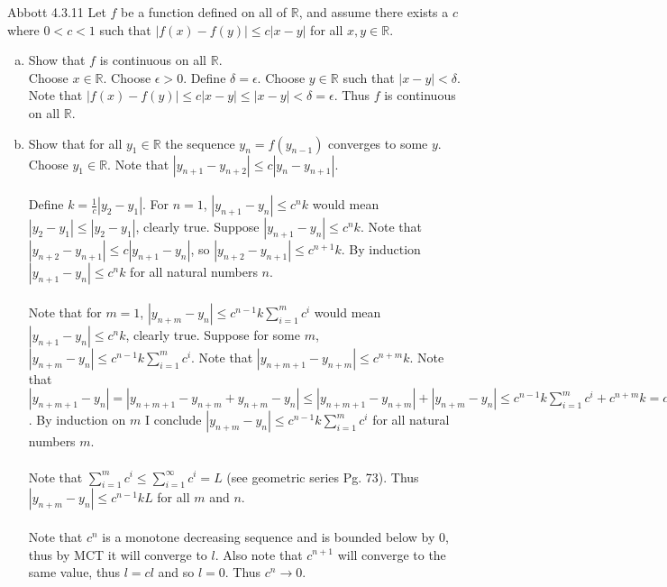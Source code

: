 \documentclass[12pt]{article}
\makeatletter
\theoremstyle{homework}
\newenvironment{exercise}[1]
{\def\@currentlabel{#1}\exercisecore}
{\endexercisecore}
\makeatother
\begin{document}
\begin{exercise} 4
Abbott 4.3.11
\end{exercise}
Let $f$ be a function defined on all of $\mathbb{R}$, and assume there exists a $c$ where $0<c<1$ such that $|f(x)-f(y)|\leq c|x-y|$ for all $x,y\in\mathbb{R}$.
\begin{enumerate}[(a)]
\item
Show that $f$ is continuous on all $\mathbb{R}$.\\
Choose $x\in\mathbb{R}$.  Choose $\epsilon>0$.  Define $\delta=\epsilon$.  Choose $y\in\mathbb{R}$ such that $|x-y|<\delta$.  Note that $|f(x)-f(y)|\leq c|x-y|\leq |x-y|<\delta=\epsilon$.  Thus $f$ is continuous on all $\mathbb{R}$.
\item
Show that for all $y_1\in\mathbb{R}$ the sequence $y_n=f(y_{n-1})$ converges to some $y$.\\
Choose $y_1\in\mathbb{R}$.  Note that $|y_{n+1}-y_{n+2}|\leq c|y_n-y_{n+1}|$.\\\\
Define $k=\frac{1}{c}|y_2-y_1|$.  For $n=1$, $|y_{n+1} - y_n|\leq c^nk$ would mean $|y_2-y_1|\leq |y_2-y_1|$, clearly true.  Suppose $|y_{n+1} - y_n|\leq c^nk$.  Note that $|y_{n+2} - y_{n+1}| \leq c|y_{n+1} - y_{n}|$, so $|y_{n+2} - y_{n+1}|\leq c^{n+1}k$.  By induction $|y_{n+1} - y_n|\leq c^nk$ for all natural numbers $n$.\\\\
Note that for $m=1$, $|y_{n+m} - y_n|\leq c^{n-1}k\sum_{i=1}^m c^i$ would mean $|y_{n+1} - y_n|\leq c^nk$, clearly true.  Suppose for some $m$, $|y_{n+m} - y_n|\leq c^{n-1}k\sum_{i=1}^m c^i$.  Note that $|y_{n+m+1} - y_{n+m}|\leq c^{n+m}k$.  Note that $|y_{n+m+1} - y_n|=|y_{n+m+1} - y_{n+m}+y_{n+m} - y_n|\leq|y_{n+m+1} - y_{n+m}|+|y_{n+m} - y_n| \leq c^{n-1}k\sum_{i=1}^m c^i+c^{n+m}k=c^{n-1}k(\sum_{i=1}^mc^i+c^{m+1})=c^{n-1}k\sum_{i=1}^{m+1}c^i$.  By induction on $m$ I conclude $|y_{n+m} - y_n|\leq c^{n-1}k\sum_{i=1}^m c^i$ for all natural numbers $m$.\\\\
Note that $\sum_{i=1}^mc^i\leq \sum_{i=1}^{\infty}c^i=L$ (see geometric series Pg. 73).  Thus $|y_{n+m} - y_n|\leq c^{n-1}kL$ for all $m$ and $n$.\\\\
Note that $c^n$ is a monotone decreasing sequence and is bounded below by 0, thus by MCT it will converge to $l$.  Also note that $c^{n+1}$ will converge to the same value, thus $l=cl$ and so $l=0$.  Thus $c^n\rightarrow 0$.\\\\

\end{enumerate}
\end{document}
